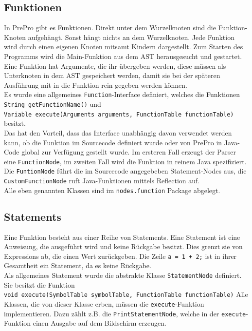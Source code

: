 \subsection{Funktionen}
In PrePro gibt es Funktionen.
Direkt unter dem Wurzelknoten sind die Funktion-Knoten aufgehängt.
Sonst hängt nichts an dem Wurzelknoten.
Jede Funktion wird durch einen eigenen Knoten mitsamt Kindern dargestellt.
Zum Starten des Programms wird die Main-Funktion aus dem \ac{AST} herausgesucht und gestartet.
Eine Funktion hat Argumente, die ihr übergeben werden, diese müssen als Unterknoten in dem \ac{AST} gespeichert werden, damit sie bei der späteren Ausführung mit in die Funktion rein gegeben werden können.\\
Es wurde eine allgemeines \texttt{Function}-Interface definiert, welches die Funktionen \texttt{String getFunctionName()} und\\ \texttt{Variable execute(Arguments arguments, FunctionTable functionTable)} besitzt.\\
Das hat den Vorteil, dass das Interface unabhängig davon verwendet werden kann, ob die Funktion im Sourcecode definiert wurde oder von PrePro in Java-Code global zur Verfügung gestellt wurde.
Im ersteren Fall erzeugt der Parser eine \texttt{FunctionNode}, im zweiten Fall wird die Funktion in reinem Java spezifiziert.
Die \texttt{FuntionNode} führt die im Sourcecode angegebeben Statement-Nodes aus, die \texttt{CustomFunctionNode} ruft Java-Funktionen mittels Reflection auf.\\
Alle eben genannten Klassen sind im \texttt{nodes.function} Package abgelegt.

\subsection{Statements}
Eine Funktion besteht aus einer Reihe von Statements.
Eine Statement ist eine Anweisung, die ausgeführt wird und keine Rückgabe besitzt.
Dies grenzt sie von Expressions ab, die einen Wert zurückgeben.
Die Zeile \texttt{a = 1 + 2;} ist in ihrer Gesamtheit ein Statement, da es keine Rückgabe.\\
Als allgemeines Statement wurde die abstrakte Klasse \texttt{StatementNode} definiert.
Sie besitzt die Funktion\\ \texttt{void execute(SymbolTable symbolTable, FunctionTable functionTable)}
Alle Klassen, die von dieser Klasse erben, müssen die \texttt{execute}-Funktion implementieren.
Dazu zählt z.B. die \texttt{PrintStatementNode}, welche in der \texttt{execute}-Funktion einen Ausgabe auf dem Bildschirm erzeugen.

